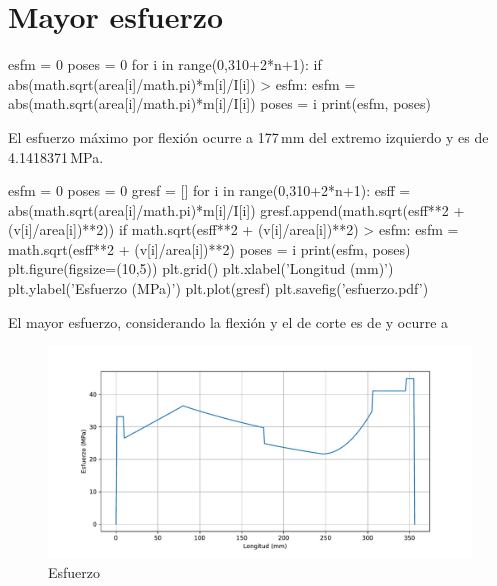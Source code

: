 \documentclass[a4paper,11pt]{report}
\begin{document}
\chapter{Mayor esfuerzo}
\begin{pyglist}[language=python,caption={Cálculo del esfuerzo por flexión},style=tango]
esfm = 0
poses = 0
for i in range(0,310+2*n+1):
    if abs(math.sqrt(area[i]/math.pi)*m[i]/I[i]) > esfm:
        esfm = abs(math.sqrt(area[i]/math.pi)*m[i]/I[i])
        poses = i
print(esfm, poses)
\end{pyglist}
El esfuerzo máximo por flexión ocurre a 177\,mm del extremo izquierdo y es de 4.1418371\,MPa.
\begin{pyglist}[language=python,caption={Cálculo del esfuerzo máximo},style=tango]
esfm = 0
poses = 0
gresf = []
for i in range(0,310+2*n+1):
    esff = abs(math.sqrt(area[i]/math.pi)*m[i]/I[i])
    gresf.append(math.sqrt(esff**2 + (v[i]/area[i])**2))
    if math.sqrt(esff**2 + (v[i]/area[i])**2) > esfm:
        esfm = math.sqrt(esff**2 + (v[i]/area[i])**2)
        poses = i
print(esfm, poses)
plt.figure(figsize=(10,5))
plt.grid()
plt.xlabel('Longitud (mm)')
plt.ylabel('Esfuerzo (MPa)')
plt.plot(gresf)
plt.savefig('esfuerzo.pdf')
\end{pyglist}
El mayor esfuerzo, considerando la flexión y el de corte es de  y ocurre a 
\begin{figure}[H]
\centering
\includegraphics[scale=0.72]{esfuerzo.pdf}
\caption{Esfuerzo}
\end{figure}
\end{document}
